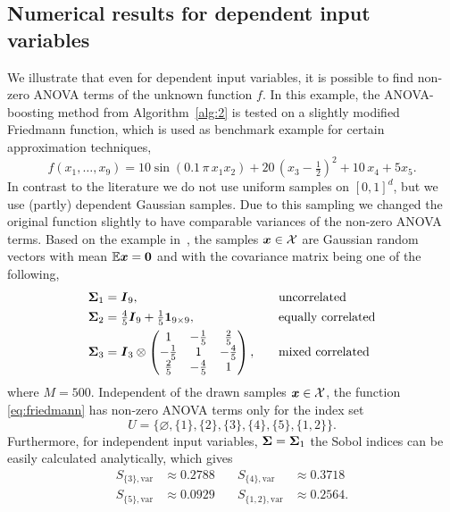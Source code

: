 \documentclass{article}
\renewcommand{\vec}[1]{\ensuremath \mathbf{\boldsymbol{#1}}}
\newcommand{\X}{\ensuremath{\mathcal{X}}}
\newcommand{\x}{\ensuremath{\vec x}}
\newcommand{\E}{\ensuremath{\mathbb{E}}}
\theoremstyle{definition}
\numberwithin{equation}{section}
\begin{document}
\subsection{Numerical results for dependent input variables}\label{sec:num2}
We illustrate that even for dependent input variables, it is possible to find non-zero ANOVA terms of the unknown function $f$.
In this example, the ANOVA-boosting method from Algorithm~\ref{alg:2} is tested on a slightly modified Friedmann function, which is
used as benchmark example for certain approximation techniques,
\begin{equation}\label{eq:friedmann}
 f(x_1,\ldots,x_{9}) = 10 \sin(0.1\,\pi \, x_1 x_2) + 20 \, (x_3- \tfrac 12)^2 + 10 \, x_4 + 5 x_5.
\end{equation}
In contrast to the literature we do not use uniform samples on $[0,1]^d$, but we use (partly) dependent Gaussian samples. Due to this sampling we changed the original function slightly to have comparable variances of the non-zero ANOVA terms.
Based on the example in~\cite{Ra142}, the samples $\x\in \X$ are Gaussian random vectors with mean $\E \x = \vec 0$ and with the covariance matrix being one of the following,
\begin{align}
\vec \Sigma_1 &= \vec I_{9}, && \quad\text{uncorrelated}\notag\\
\vec \Sigma_2 &= \tfrac 45 \vec I_{9} + \tfrac 15 \vec 1_{9\times 9},  && \quad\text{equally correlated}\label{eq:mu2}\\
\vec \Sigma_3 &= 
\vec I_{3} \otimes
\begin{pmatrix} 1 & -\tfrac 15 & \tfrac 25 \\
-\tfrac 15 & 1 & -\tfrac 45\\
\tfrac 25 & -\tfrac 45 & 1\\
\end{pmatrix},  && \quad\text{mixed correlated}\label{eq:mu3}
\end{align}
where $M = 500$.
Independent of the drawn samples $\x\in \X$, the function \eqref{eq:friedmann} has non-zero ANOVA terms only for the index set 
\begin{equation}\label{eq:U_fried}
U=\{\varnothing, \{1\}, \{2\},\{3\},\{4\},\{5\},\{1,2\}\}.
\end{equation} 
Furthermore, for independent input variables, $\vec \Sigma = \vec \Sigma_1$ the Sobol indices can be easily calculated analytically, which gives
\begin{align*}
S_{\{3\},\text{var}}&\approx 0.2788\quad& 
S_{\{4\},\text{var}}&\approx 0.3718\\
S_{\{5\},\text{var}}&\approx 0.0929 \quad&
S_{\{1,2\},\text{var}}&\approx 0.2564.
\end{align*}
\end{document}
